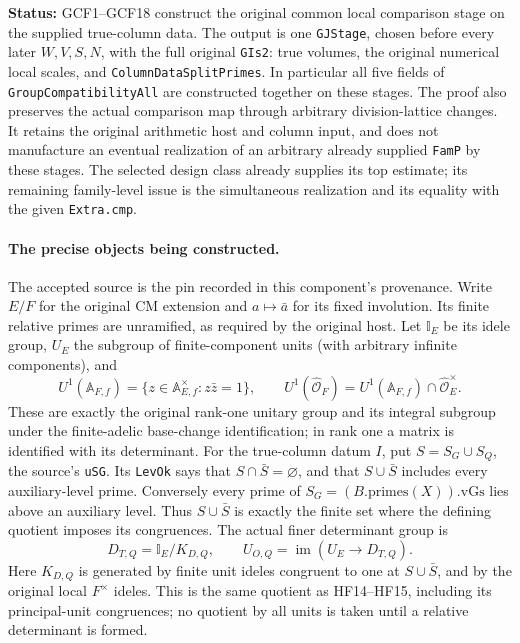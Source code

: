 \documentclass[11pt,a4paper]{article}
\numberwithin{equation}{section}
\theoremstyle{remark}\newtheorem{remark}[theorem]{Remark}
\newcommand{\status}[1]{\textbf{Status:} #1}
\begin{document}
\status{GCF1--GCF18 construct the original common local comparison stage
on the supplied true-column data.  The output is one \texttt{GJStage},
chosen before every later \(W,V,S,N\), with the full original
\texttt{GIs2}: true volumes, the original numerical local scales, and
\texttt{Column\allowbreak Data\allowbreak Split\allowbreak Primes}.  In particular all five fields of
\texttt{Group\allowbreak Compatibility\allowbreak All} are constructed together on these
stages.  The proof also preserves the actual comparison map through
arbitrary division-lattice changes.  It retains the original arithmetic
host and column input, and does not manufacture an eventual realization
of an arbitrary already supplied \texttt{Fam\allowbreak P} by these stages.
The selected design class already supplies its top estimate; its
remaining family-level issue is the simultaneous realization and its
equality with the given \texttt{Extra.\allowbreak cmp}.}

\paragraph{The precise objects being constructed.}
The accepted source is the pin recorded in this component's provenance.
Write \(E/F\) for the original CM extension and \(a\mapsto\bar a\)
for its fixed involution.  Its finite relative primes are unramified,
as required by the original host.  Let \(\mathbb I_E\) be its idele
group, \(U_E\) the subgroup of finite-component units (with arbitrary
infinite components), and
\[
 U^1(\mathbb A_{F,f})=
 \{z\in\mathbb A_{E,f}^{\times}:z\bar z=1\},\qquad
 U^1(\widehat{\mathcal O}_F)=U^1(\mathbb A_{F,f})
                                  \cap\widehat{\mathcal O}_E^{\times}.
 \tag{GCF.1}
\]
These are exactly the original rank-one unitary group and its integral
subgroup under the finite-adelic base-change identification; in rank
one a matrix is identified with its determinant.  For the true-column
datum \(I\), put \(S=S_G\cup S_Q\), the source's \texttt{u\allowbreak SG}.
Its \texttt{Lev\allowbreak Ok} says that \(S\cap\bar S=\varnothing\), and that
\(S\cup\bar S\) includes every auxiliary-level prime.  Conversely every prime of
\(S_G=(B.\mathrm{primes}(X)).\mathrm{vGs}\) lies above an
auxiliary level.  Thus \(S\cup\bar S\) is exactly the finite
set where the defining quotient imposes its congruences.
The actual finer determinant group is
\[
 D_{T,Q}=\mathbb I_E/K_{D,Q},\qquad
 U_{O,Q}=\operatorname{im}(U_E\longrightarrow D_{T,Q}).
 \tag{GCF.2}
\]
Here \(K_{D,Q}\) is generated by finite unit ideles congruent to one
at \(S\cup\bar S\), and by the original local \(F^{\times}\)
ideles.  This is the same quotient as HF14--HF15, including its
principal-unit congruences; no quotient by all units is taken until a
relative determinant is formed.
\end{document}
